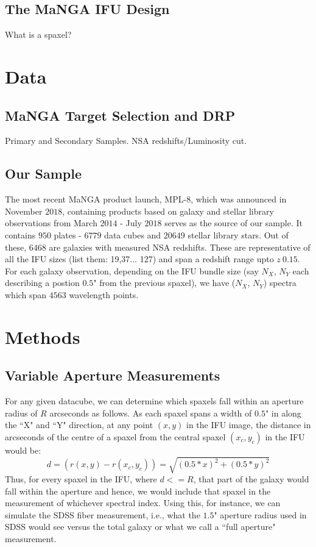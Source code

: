 \subsection{The MaNGA IFU Design}
What is a spaxel?

\section{Data}
\subsection{MaNGA Target Selection and DRP}
Primary and Secondary Samples. NSA redshifts/Luminosity cut.

\subsection{Our Sample}
The most recent MaNGA product launch, MPL-$8$, which was announced in November $2018$, containing products based on galaxy and stellar library observations from March $2014$ - July $2018$ serves as the source of our sample. It contains $950$ plates - $6779$ data cubes and $20649$ stellar library stars. Out of these, $6468$ are galaxies with measured NSA redshifts. These are representative of all the IFU sizes (list them: 19,37... 127) and span a redshift range upto $z ~ 0.15$.\\
For each galaxy observation, depending on the IFU bundle size (say $N_{X}$, $N_{Y}$ each describing a postion $0.5$" from the previous spaxel), we have ($N_{X}$, $N_{Y}$) spectra which span $4563$ wavelength points. 

\section{Methods}

\subsection{Variable Aperture Measurements}
For any given datacube, we can determine which spaxels fall within an aperture radius of $R$ arcseconds as follows. As each spaxel spans a width of $0.5$" in along the ``X" and ``Y" direction, at any point $(x,y)$ in the IFU image, the distance in arcseconds of the centre of a spaxel from the central spaxel $(x_{c},y_{c})$ in the IFU would be:
$$ d = (r(x,y) - r(x_{c},y_{c})) = \sqrt{(0.5*x)^2 + (0.5*y)^2} $$
Thus, for every spaxel in the IFU, where $d<=R$, that part of the galaxy would fall within the aperture and hence, we would include that spaxel in the measurement of whichever spectral index. Using this, for instance, we can simulate the SDSS fiber measurement, i.e.,  what the $1.5$" aperture radius used in SDSS would see versus the total galaxy or what we call a ``full aperture" measurement.

